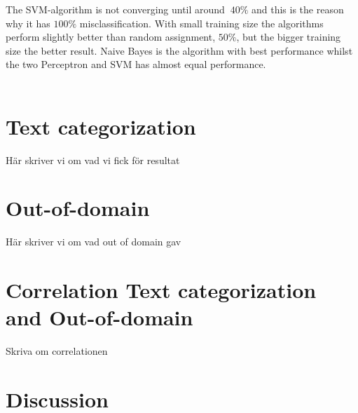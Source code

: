 The SVM-algorithm is not converging until around $~40 \%$ and this is the reason why it has $100 \%$ misclassification. With small training size the algorithms perform slightly better than random assignment, $50 \%$, but the bigger training size the better result. Naive Bayes is the algorithm with best performance whilst the two Perceptron and SVM has almost equal performance. 
\\\\
\section{Text categorization}
Här skriver vi om vad vi fick för resultat
\section{Out-of-domain}
Här skriver vi om vad out of domain gav
\section{Correlation Text categorization and Out-of-domain}
Skriva om correlationen

\section{Discussion}

